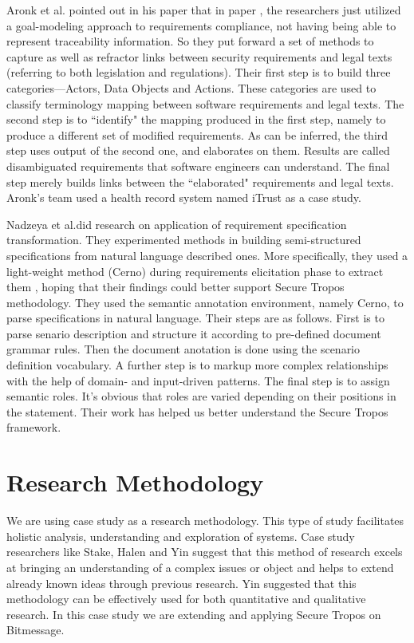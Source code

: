 \documentclass{acm_proc_article-sp}
\begin{document}
Aronk et al.\cite{Aaronk10} pointed out in his paper that in paper \cite{Massacci2005445}, the researchers just utilized a goal-modeling approach to requirements compliance, not having being able to represent traceability information. So they put forward a set of methods to capture as well as refractor links between security requirements and legal texts (referring to both legislation and regulations). Their first step is to build three categories---Actors, Data Objects and Actions. These categories are used to classify terminology mapping between software requirements and legal texts. The second step is to ``identify" the mapping produced in the first step, namely to produce a different set of modified requirements. As can be inferred, the third step uses output of the second one, and elaborates on them. Results are called disambiguated requirements that software engineers can understand. The final step merely builds links between the ``elaborated" requirements and legal texts. Aronk's team used a health record system named iTrust as a case study.

\par
Nadzeya et al.\cite{Nadzeya08}did research on application of requirement specification transformation. They experimented methods in building semi-structured specifications from natural language described ones. More specifically, they used a light-weight method (Cerno)\cite{Nadzeya06} during requirements elicitation phase to extract them , hoping that their findings could better support Secure Tropos methodology. They used the semantic annotation environment, namely Cerno, to parse specifications in natural language. Their steps are as follows. First is to parse senario description and structure it according to pre-defined document grammar rules. Then the document anotation is done using the scenario definition vocabulary. A further step is to markup more complex relationships with the help of domain- and input-driven patterns. The final step is to assign semantic roles. It's obvious that roles are varied depending on their positions in the statement. Their work has helped us better understand the Secure Tropos framework. %



\section{Research Methodology}\label{Sec:Research Methodology}
We are using case study as a research methodology. This type of study facilitates holistic analysis, understanding and exploration of systems. Case study researchers like Stake, Halen and Yin suggest that this method of research excels at bringing an understanding of a complex issues or object and helps to extend already known ideas through previous research. Yin suggested that this methodology can be effectively used for both quantitative and qualitative research. In this case study we are extending and applying Secure Tropos on Bitmessage.
\end{document}
